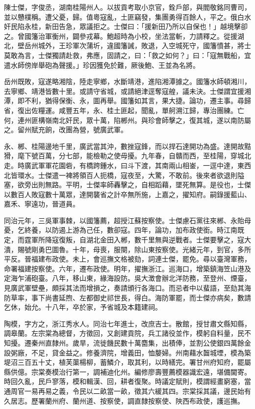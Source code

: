 \begin{pinyinscope}
陳士傑，字俊丞，湖南桂陽州人。以拔貢考取小京官，銓戶部，與閻敬銘同曹司，並以戇樸稱。遭父憂，歸。值粵寇亂，土匪竊發，集團勇得百餘人，平之。俄白水奸民陷永桂，新田告急，眾議拒之。士傑曰：「援新田乃所以自保也！」越境擊卻之。曾國籓治軍衡州，闢參戎幕。鮑超時為小校，坐法當斬，力請釋之。從援湖北，壁岳州城外，王珍軍次蒲圻，違國籓誡，敗退，入空城死守，國籓憤甚，將士莫敢為言，士傑獨請赴救，弗應，固請之，曰：「救之如何？」曰：「寇無戰船，宜遣水師傍岸舉砲為聲援。」珍因獲免於難，厥後鮑、王並為名將。

岳州既敗，寇遂略湘陰，陸走寧鄉，水斷靖港，進陷湘潭據之。國籓水師頓湘川，去寧鄉、靖港皆數十里。或請守省城，或請絕津逕奪寇艎，議未決。士傑謂宜援湘潭，即不利，猶得保衡、永，圖再舉。國籓如其言，果大捷。論功，遷主事。尋歸省，復出佐糧運。咸豐五年，永、桂土匪起，聞亂，單舸溯江歸，專治團練。亡何，連州匪構嶺南北奸民，眾十萬，陷郴州。與珍會師擊之，復其城，遂以南防屬之。留州賦充餉，改團為營，號廣武軍。

永、郴、桂陽邊地千里，廣武當其沖，數挫寇鋒，而以捍石達開功為盛。達開故黠猾，麾下號百萬，分七部，能檢勒之使毋擾。九年春，自贛而西，至桂陽，穿城北走。時廣武軍軍花園砦，有橋跨鍾水，曰斗下渡，其南兩山相崟，一逕中達，東西北皆環水。士傑遣一裨將領百人扼橋，寇夜至，大驚，不敢前。後來者欲退則隘塞，欲旁出則無路。平明，士傑率師轟擊之，自相蹈藉，墜死無算。是役也，士傑以數百人敗寇數十萬眾，達開襲省之計卒無所施，上嘉之，擢知府。嗣錄援藍山、嘉禾、寧遠功，晉道員。

同治元年，三吳軍事棘，以國籓薦，超授江蘇按察使。士傑慮石黨往來郴、永貽母憂，乞終養，以防遏上游為己任，數卻寇。四年，論功，加布政使銜。時江南既定，而霆軍所降寇復叛，自湖北金田入郴，數千里無與逆戰者。士傑要擊之，寇大潰，賜號剛勇巴圖魯。十年，母喪，服闋，除山東按察使。光緒元年，到官，多所平反。晉福建布政使。未上，會巡撫文格被劾，詞連士傑，罷免。尋以臺灣軍務，命署福建按察使。六年，遷布政使。明年，擢撫浙江。巡海口，增築鎮海笠山港及定海乍浦砲臺。八年，移山東，緣海設防。吳大澂會辦北洋防務，至登州、煙臺，見廣武軍壁壘，頗採其法而增損之，奏請頒行各海口。而忌者中以蜚語，至劾其海防草率，事下尚書延煦、左都御史祁世長，得白。海防軍罷，而士傑亦病矣，數請乞休，始允。十八年，卒於家，予省城及本籍建祠。

陶模，字方之，浙江秀水人。同治七年進士，改庶吉士。散館，授甘肅文縣知縣，調皋蘭。左宗棠為總督，方徵回，又創建貢院，兵工諸役並作，模躬自料量，民不知擾。遷秦州直隸州。歲旱，流徙饑民數十萬麕集，出積俸，並割公使銀四萬餘金設粥廠，不足，貸金益之。修養濟院，增義田，恤嫠婦。州南藉水齧城堙，模為築堤沼三百五十丈，植芙蕖楊柳，蓄鱗介，取其利，以時繕完。署甘州府知府，罷屬縣供億。宗棠奏模治行第一，調補迪化州。編修廖壽豐薦模器識宏遠，堪備閫寄。時回久亂，民戶寥落，模和輯漢、回，耕者復聚。時議定賦則，模謂經畫窮塞，當通周官一易再易之義，令民以二畝當一畝，徵其六緩其四。宗棠採其議，邊民始有久居志。歷署蘭州府、蘭州道、按察使，調直隸按察使、陜西布政使，護巡撫。


\end{pinyinscope}
